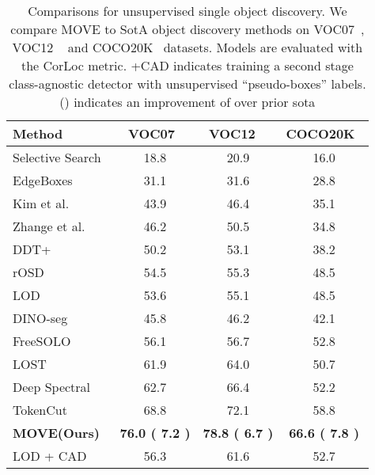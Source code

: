 \documentclass{article}
\newcommand\methodname{MOVE\xspace}
\begin{document}
\begin{table}
\caption{{Comparisons for unsupervised single object discovery}. We compare \methodname to SotA object discovery methods on VOC07~\cite{pascal-voc-2007}, VOC12 ~\cite{pascal-voc-2012} and COCO20K~\cite{lin2014microsoft,vo2020toward} datasets. Models are evaluated with the CorLoc metric. +CAD indicates training a second stage class-agnostic detector with unsupervised ``pseudo-boxes'' labels. (\textcolor{olivegreen}{}) indicates an improvement of  over prior sota}
\label{tab:single-ob-discovery}  
\centering
\small
\begin{tabularx}{\linewidth}{@{}Xc@{\hspace{3em}}c@{\hspace{3em}}c@{}}
    \toprule Method &  VOC07~\cite{pascal-voc-2007} & VOC12 ~\cite{pascal-voc-2012}& COCO20K~\cite{lin2014microsoft,vo2020toward}  \\
    \midrule
    Selective Search~\cite{uijlings2013selective, LOST} & 18.8 & 20.9 & 16.0 \\
    EdgeBoxes~\cite{zitnick2014edge, LOST} & 31.1 & 31.6 & 28.8 \\
    Kim et al.~\cite{kim2009unsupervised, LOST}&  43.9 & 46.4& 35.1 \\
    Zhange et al.~\cite{zhang2020object, LOST}&  46.2 & 50.5 & 34.8 \\
    DDT+~\cite{wei2019unsupervised, LOST}&  50.2 & 53.1 & 38.2 \\
    rOSD~\cite{vo2020toward, LOST} &  54.5 & 55.3 & 48.5 \\
    LOD~\cite{vo2021large, LOST}&53.6 & 55.1 & 48.5 \\
    DINO-seg~\cite{caron2021emerging,LOST}&   45.8 & 46.2 & 42.1 \\
    FreeSOLO~\cite{wang2022freesolo} &  56.1 & 56.7 & 52.8 \\
    LOST~\cite{LOST}& 61.9 & 64.0 & 50.7 \\
    Deep Spectral \cite{melas2022} & 62.7 & 66.4 & 52.2 \\
    TokenCut \cite{wang2022self}& 68.8 & 72.1 &  58.8 \\ 
    \bf\methodname (Ours) & \hspace{3em}\bf76.0 (\textcolor{olivegreen}{ \bf7.2  }) & \hspace{3em}\bf78.8 (\textcolor{olivegreen}{ \bf6.7 }) & \hspace{3em}\bf66.6 (\textcolor{olivegreen}{ \bf7.8 }) \\ \midrule
    LOD + CAD\cite{LOST} & 56.3 & 61.6 & 52.7 \\

\end{tabularx}
\end{table}
\end{document}
